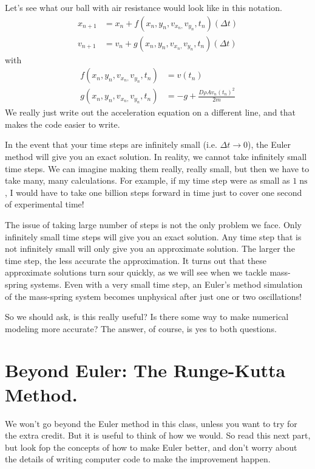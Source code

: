 \documentclass[twoside,11pt,ShortChapTitles]{BYUTextbook}
\begin{document}
Let's see what our ball with air resistance would look like in this notation. \begin{align*}
x_{n+1}  & =x_{n}+f(x_{n},y_{n},v_{x_{n},}v_{y_{n}},t_{n})(\Delta t)\\
v_{n+1}  & =v_{n}+g(x_{n},y_{n},v_{x_{n},}v_{y_{n}},t_{n})(\Delta t)
\end{align*}
with
\begin{align*}
f(x_{n},y_{n},v_{x_{n},}v_{y_{n}},t_{n})  & =v\left(  t_{n}\right) \\
g(x_{n},y_{n},v_{x_{n},}v_{y_{n}},t_{n})  & =-g+\frac{D\rho Av_{n}(t_{n})^{2} }{2m} \end{align*}
We really just write out the acceleration equation on a different line, and
that makes the code easier to write.

In the event that your time steps are infinitely small (i.e. $\Delta
t\rightarrow0$), the Euler method will give you an exact solution. In reality,
we cannot take infinitely small time steps. We can imagine making them really,
really small, but then we have to take many, many calculations. For example,
if my time step were as small as $1 \operatorname{ns} $, I would have to take one billion steps forward in time just to cover one
second of experimental time!

The issue of taking large number of steps is not the only problem we face.
Only infinitely small time steps will give you an exact solution. Any time
step that is not infinitely small will only give you an approximate solution.
The larger the time step, the less accurate the approximation. It turns out
that these approximate solutions turn sour quickly, as we will see when we
tackle mass-spring systems. Even with a very small time step, an Euler's
method simulation of the mass-spring system becomes unphysical after just one
or two oscillations!

So we should ask, is this really useful? Is there some way to make numerical
modeling more accurate? The answer, of course, is yes to both questions.

\section{Beyond Euler: The Runge-Kutta Method.}

We won't go beyond the Euler method in this class, unless you want to try for
the extra credit. But it is useful to think of how we would. So read this next
part, but look fop the concepts of how to make Euler better, and don't worry
about the details of writing computer code to make the improvement happen.
\end{document}
